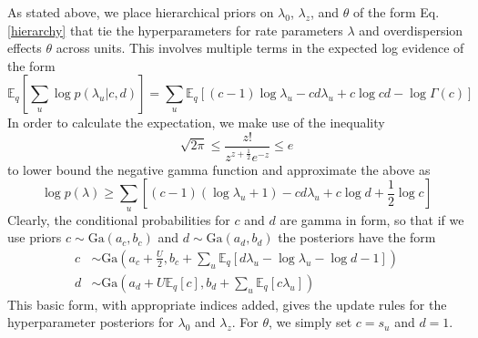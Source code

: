 \documentclass{article} %
\begin{document}
As stated above, we place hierarchical priors on $\lambda_0$, $\lambda_z$, and $\theta$ of the form Eq. \ref{hierarchy} that tie the hyperparameters for rate parameters $\lambda$ and overdispersion effects $\theta$ across units.  This involves multiple terms in the expected log evidence of the form
\begin{equation}
    \mathbb{E}_q \left[\sum_u \log p(\lambda_u|c, d)\right] = \sum_u \mathbb{E}_q \left[ 
    (c - 1) \log \lambda_u - cd\lambda_u + c \log cd - \log \Gamma(c) 
    \right] 
\end{equation}
In order to calculate the expectation, we make use of the inequality %
\begin{equation}
    \sqrt{2\pi} \le \frac{z!}{z^{z+\frac{1}{2}} e^{-z}} \le e
\end{equation}
to lower bound the negative gamma function and approximate the above as
\begin{equation}
    \log p(\lambda) \ge \sum_u \left[ 
    (c - 1) (\log \lambda_u + 1) - cd\lambda_u + c \log d + \frac{1}{2}\log c\right]
\end{equation}
Clearly, the conditional probabilities for $c$ and $d$ are gamma in form, so that if we use priors $c \sim \text{Ga}(a_c, b_c)$ and $d\sim \text{Ga}(a_d, b_d)$ the posteriors have the form
\begin{align}
    c &\sim \text{Ga}\left(a_c + \frac{U}{2}, 
    b_c + \sum_u\mathbb{E}_q 
        \left[d \lambda_u - \log \lambda_u - \log d - 1\right]\right) \\
    d &\sim \text{Ga}\left(
        a_d + U\mathbb{E}_q[c], b_d + \sum_u \mathbb{E}_q [c \lambda_u]
    \right)
\end{align}
This basic form, with appropriate indices added, gives the update rules for the hyperparameter posteriors for $\lambda_0$ and $\lambda_z$. For $\theta$, we simply set $c = s_u$ and $d = 1$.
\end{document}
